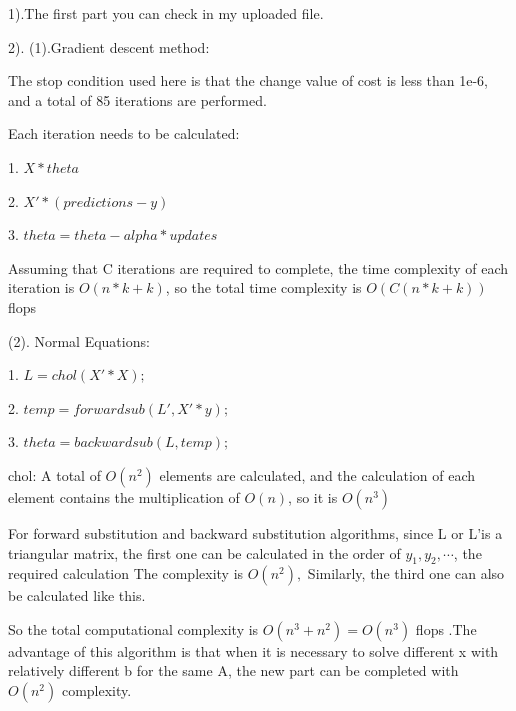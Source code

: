 \documentclass[english,onecolumn]{IEEEtran}
\begin{document}
1).The first part you can check in my uploaded  file.

2). (1).Gradient descent method:

The stop condition used here is that the change value of cost is less than 1e-6, and a total of 85 iterations are performed.

Each iteration needs to be calculated:

1. $X*theta$

2. $X' * (predictions - y)$

3. $theta = theta - alpha * updates$

Assuming that C iterations are required to complete, the time complexity of each iteration is $O(n*k+k)$, so the total time complexity is $O(C(n*k+k))$ flops

(2). Normal Equations:

1. $L = chol(X' * X);$

2. $temp = forwardsub(L',X'*y);$

3. $theta = backwardsub(L,temp);$

chol: A total of $O\left(n^{2}\right)$ elements are calculated, and the calculation of each element contains the multiplication of $O(n)$, so it is $O\left(n^{ 3}\right)$

 For forward substitution and backward substitution algorithms, since L or L'is a triangular matrix, the first one can be calculated in the order of $y_{1}, y_{2}, \cdots$, the required calculation The complexity is $O\left(n^{2}\right),$ Similarly, the third one can also be calculated like this.

So the total computational complexity is $O\left(n^{3}+n^{2}\right)=O\left(n^{3}\right)$ flops .The advantage of this algorithm is that when it is necessary to solve different x with relatively different b for the same A, the new part can be completed with $O\left(n^{2}\right)$ complexity.
\newpage
\end{document}
